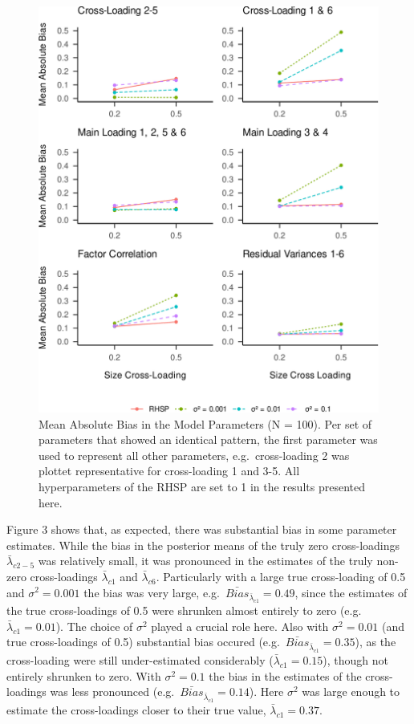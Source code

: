 \documentclass[
  english,
  man, donotrepeattitle,floatsintext]{apa6}
\begin{document}
\begin{figure}
\centering
\includegraphics{JMBKoch_thesis_files/figure-latex/unnamed-chunk-4-1.pdf}
\caption{\label{fig:unnamed-chunk-4}Mean Absolute Bias in the Model Parameters (N = 100). Per set of parameters that showed an identical pattern, the first parameter was used to represent all other parameters, e.g.~cross-loading 2 was plottet representative for cross-loading 1 and 3-5. All hyperparameters of the RHSP are set to 1 in the results presented here.}
\end{figure}

Figure 3 shows that, as expected, there was substantial bias in some parameter estimates. While the bias in the posterior means of the truly zero cross-loadings \(\bar{\lambda}_{c 2-5}\) was relatively small, it was pronounced in the estimates of the truly non-zero cross-loadings \(\bar{\lambda}_{c 1}\) and \(\bar{\lambda}_{c 6}\). Particularly with a large true cross-loading of 0.5 and \(\sigma^2 = 0.001\) the bias was very large, e.g.~\(\bar{Bias}_{\bar{\lambda}_{c 1}} = 0.49\), since the estimates of the true cross-loadings of 0.5 were shrunken almost entirely to zero (e.g.~\(\bar{\lambda}_{c 1} = 0.01\)). The choice of \(\sigma^2\) played a crucial role here. Also with \(\sigma^2 = 0.01\) (and true cross-loadings of 0.5) substantial bias occured (e.g.~\(\bar{Bias}_{\bar{\lambda}_{c 1}} = 0.35\)), as the cross-loading were still under-estimated considerably (\(\bar{\lambda}_{c 1} = 0.15\)), though not entirely shrunken to zero. With \(\sigma^2 = 0.1\) the bias in the estimates of the cross-loadings was less pronounced (e.g.~\(\bar{Bias}_{\bar{\lambda}_{c 1}} = 0.14\)). Here \(\sigma^2\) was large enough to estimate the cross-loadings closer to their true value, \(\bar{\lambda}_{c 1} = 0.37\).
\end{document}
